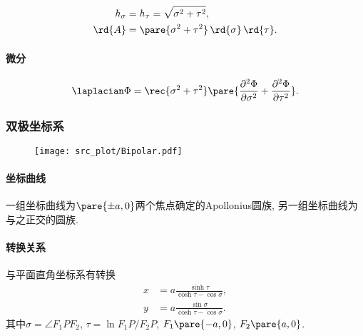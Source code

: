 \documentclass{article}
\begin{document}
\begin{align*}
    h_\sigma &= h_\tau = \sqrt{\sigma^2+\tau^2},\\ \rd{A} &= \pare{\sigma^2+\tau^2}\,\rd{\sigma}\,\rd{\tau}.
\end{align*}


\paragraph{微分} %
\label{par:微分}

\begin{align*}
    \laplacian \Phi = \rec{\sigma^2 + \tau^2} \pare{\frac{\partial^2\Phi}{\partial \sigma^2} + \frac{\partial^2\Phi}{\partial\tau^2}}.
\end{align*}



\subsubsection{双极坐标系} %
\label{ssub:双极坐标系}

\begin{figure}[ht]
    \centering
    \texttt{[image: src\_plot/Bipolar.pdf]}
\end{figure}

\paragraph{坐标曲线} %
\label{par:坐标曲线}

一组坐标曲线为$\pare{\pm a, 0}$两个焦点确定的Apollonius圆族, 另一组坐标曲线为与之正交的圆族.


\paragraph{转换关系} %
\label{par:转换关系}

与平面直角坐标系有转换
\begin{align*}
    x &= a \frac{\sinh \tau}{\cosh \tau - \cos\sigma}, \\
    y &= a \frac{\sin\sigma}{\cosh\tau - \cos\sigma}.
\end{align*}
其中$\sigma = \angle F_1 P F_2$, $\tau = \ln F_1P/F_2P$, $F_1\pare{-a,0}$, $F_2\pare{a,0}$.
\end{document}
